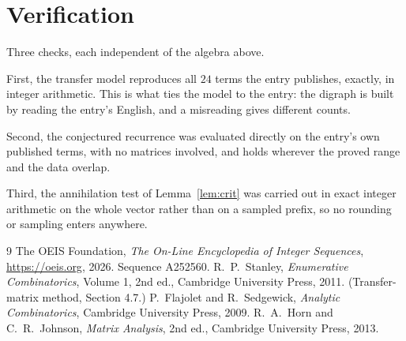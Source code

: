 \documentclass[11pt,a4paper]{article}
\theoremstyle{plain}
\theoremstyle{definition}
\begin{document}
\section{Verification}

Three checks, each independent of the algebra above.

First, the transfer model reproduces all $24$ terms the entry publishes, exactly, in
integer arithmetic. This is what ties the model to the entry: the digraph is built by reading
the entry's English, and a misreading gives different counts.

Second, the conjectured recurrence was evaluated directly on the entry's own published terms,
with no matrices involved, and holds wherever the proved range and the data overlap.

Third, the annihilation test of Lemma~\ref{lem:crit} was carried out in exact integer
arithmetic on the whole vector rather than on a sampled prefix, so no rounding or sampling
enters anywhere.

\begin{thebibliography}{9}
 The OEIS Foundation, \emph{The On-Line Encyclopedia of Integer
Sequences}, \url{https://oeis.org}, 2026. Sequence A252560.
 R.~P.~Stanley, \emph{Enumerative Combinatorics}, Volume 1, 2nd ed.,
Cambridge University Press, 2011. (Transfer-matrix method, Section 4.7.)
 P.~Flajolet and R.~Sedgewick, \emph{Analytic Combinatorics}, Cambridge
University Press, 2009.
 R.~A.~Horn and C.~R.~Johnson, \emph{Matrix Analysis}, 2nd ed., Cambridge
University Press, 2013.
\end{thebibliography}
\end{document}
